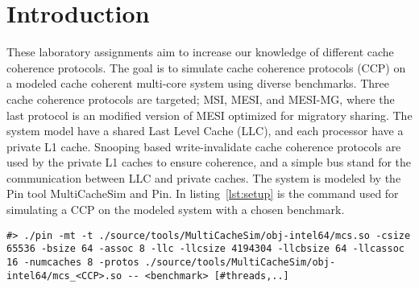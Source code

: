 \section{Introduction}
\label{sec:int}
These laboratory assignments aim to increase our knowledge of different cache coherence protocols. The goal is to simulate cache coherence protocols (CCP) on a modeled cache coherent multi-core system using diverse benchmarks. Three cache coherence protocols are targeted; MSI, MESI, and MESI-MG, where the last protocol is an modified version of MESI optimized for migratory sharing. The system model have a shared Last Level Cache (LLC), and each processor have a private L1 cache. Snooping based write-invalidate cache coherence protocols are used by the private L1 caches to ensure coherence, and a simple bus stand for the communication between LLC and private caches. The system is modeled by the Pin tool MultiCacheSim and Pin. In listing~\ref{lst:setup} is the command used for simulating a CCP on the modeled system with a chosen benchmark.   



\begin{lstlisting}[label=lst:setup, basicstyle=\scriptsize, caption={Command used for simulation.}]
#> ./pin -mt -t ./source/tools/MultiCacheSim/obj-intel64/mcs.so -csize 65536 -bsize 64 -assoc 8 -llc -llcsize 4194304 -llcbsize 64 -llcassoc 16 -numcaches 8 -protos ./source/tools/MultiCacheSim/obj-intel64/mcs_<CCP>.so -- <benchmark> [#threads,..]
\end{lstlisting}